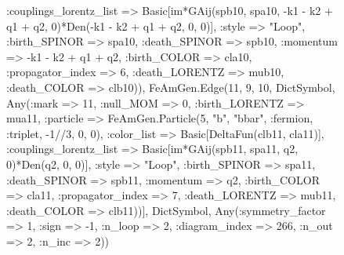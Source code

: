 \documentclass{revtex4}
\begin{document}
\begin{figure}[!htb]
\begin{center}
{:couplings_lorentz_list => Basic[im*GAij(spb10, spa10, -k1 - k2 + q1 + q2, 0)*Den(-k1 - k2 + q1 + q2, 0, 0)], :style => "Loop", :birth_SPINOR => spa10, :death_SPINOR => spb10, :momentum => -k1 - k2 + q1 + q2, :birth_COLOR => cla10, :propagator_index => 6, :death_LORENTZ => mub10, :death_COLOR => clb10)), FeAmGen.Edge(11, 9, 10, Dict{Symbol, Any}(:mark => 11, :null_MOM => 0, :birth_LORENTZ => mua11, :particle => FeAmGen.Particle(5, "b", "bbar", :fermion, :triplet, -1//3, 0, 0), :color_list => Basic[DeltaFun(clb11, cla11)], :couplings_lorentz_list => Basic[im*GAij(spb11, spa11, q2, 0)*Den(q2, 0, 0)], :style => "Loop", :birth_SPINOR => spa11, :death_SPINOR => spb11, :momentum => q2, :birth_COLOR => cla11, :propagator_index => 7, :death_LORENTZ => mub11, :death_COLOR => clb11))], Dict{Symbol, Any}(:symmetry_factor => 1, :sign => -1, :n_loop => 2, :diagram_index => 266, :n_out => 2, :n_inc => 2)) 
}
\end{center}
\end{figure}
\end{document}
